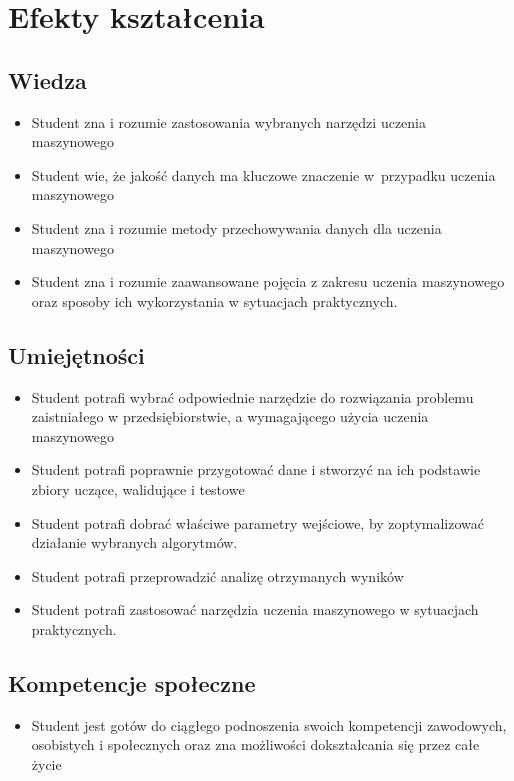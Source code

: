 \documentclass[12pt, a4paper]{article}
\begin{document}
\section{Efekty kształcenia}

\subsection*{Wiedza}
\begin{itemize}
  \item Student zna i rozumie zastosowania wybranych narzędzi uczenia maszynowego
  \item Student wie, że jakość danych ma kluczowe znaczenie w przypadku uczenia maszynowego
  \item Student zna i rozumie metody przechowywania danych dla uczenia maszynowego
  \item Student zna i rozumie zaawansowane pojęcia z zakresu uczenia maszynowego oraz sposoby ich wykorzystania w sytuacjach praktycznych.
\end{itemize}

\subsection*{Umiejętności}
\begin{itemize}
  \item Student potrafi  wybrać odpowiednie narzędzie do rozwiązania problemu zaistniałego w przedsiębiorstwie, a wymagającego użycia uczenia maszynowego
  \item Student potrafi  poprawnie przygotować dane i stworzyć na ich podstawie zbiory uczące, walidujące i testowe
  \item Student potrafi dobrać właściwe parametry wejściowe, by zoptymalizować działanie wybranych algorytmów.
  \item Student potrafi przeprowadzić analizę otrzymanych wyników
  \item Student potrafi zastosować narzędzia uczenia maszynowego w sytuacjach praktycznych.
\end{itemize}

\subsection*{Kompetencje społeczne}
\begin{itemize}
  \item Student jest gotów do ciągłego podnoszenia swoich kompetencji zawodowych, osobistych i społecznych oraz zna możliwości dokształcania się przez całe życie
\end{itemize}
\end{document}
